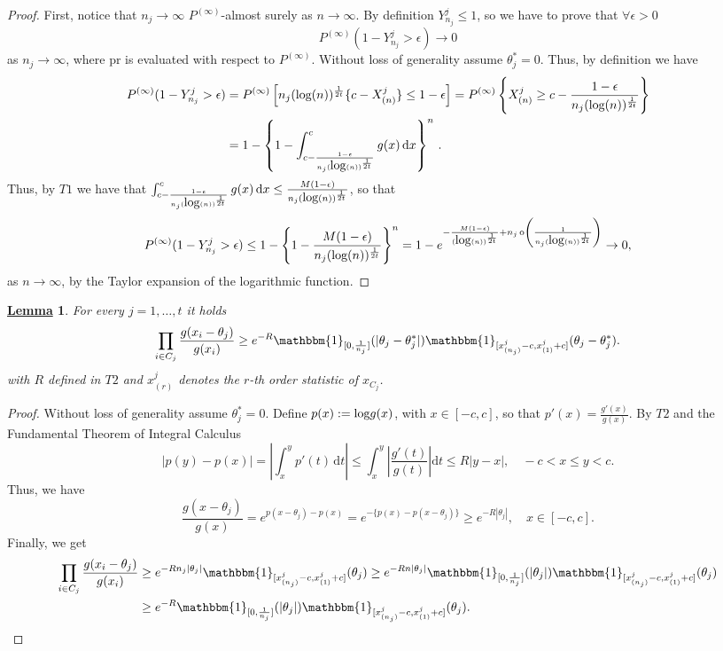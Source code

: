 \documentclass[12pt]{article}
\newtheorem{Lem}{\underline{\bf Lemma}}
\def \d {\mathrm{d}}
\def\log{\hbox{log}}
\begin{document}
\begin{proof}
First, notice that $n_j \to \infty$ $P^{(\infty)}$-almost surely as $n \to \infty$. By definition $Y^j_{n_j} \leq 1$, so we have to prove that $\forall \epsilon > 0$
\[
P^{(\infty)}\left(1- Y^j_{n_j} > \epsilon \right) \to 0
\]
as $n_j \to \infty$, where pr is evaluated with respect to $P^{(\infty)}$. Without loss of generality assume $\theta_j^* = 0$. Thus, by definition we have
\[
\begin{aligned}
P^{(\infty)}(1 - Y^j_{n_j} > \epsilon) &=P^{(\infty)}\left[n_j(\log(n))^{\frac{1}{2t}}\{c-X^j_{(n)} \} \leq 1-\epsilon \right] = P^{(\infty)}\left\{ X^j_{(n)} \geq c-\frac{1-\epsilon}{n_j(\log(n))^{\frac{1}{2t}}}\right\} \\
&= 1-\left\{1-\int_{c-\frac{1-\epsilon}{n_j(\log(n))^{\frac{1}{2t}}}}^c g(x) \, \mathrm{d}x \right\}^{n}\,.
\end{aligned}
\]
Thus, by $T1$ we have that $\int_{c-\frac{1-\epsilon}{n_j(\log(n))^{\frac{1}{2t}}}}^c g(x) \, \mathrm{d}x \leq \frac{M(1-\epsilon)}{n_j(\log(n))^{\frac{1}{2t}}}$, so that
\[
P^{(\infty)}(1 - Y^j_{n_j} > \epsilon) \leq 1-\left\{ 1- \frac{M(1-\epsilon)}{n_j(\log(n))^{\frac{1}{2t}}}\right\}^{n}= 1-e^{-\frac{M(1-\epsilon)}{(\log(n))^{\frac{1}{2t}}}+n_j \, \text{o}\left(\frac{1}{n_j(\log(n))^{\frac{1}{2t}}}\right)} \to 0,
\]
as $n \to \infty$, by the Taylor expansion of the logarithmic function.
\end{proof}
\begin{Lem}\label{denom1}
For every $j = 1, \dots, t$ it holds
\[
\prod_{i \in C_j} \frac{g(x_i - \theta_j)}{g(x_i)} \geq e^{-R} \mathbbm{1}_{[0,\frac{1}{n_j}]} (|\theta_j-\theta_j^*|) \mathbbm{1}_{[x^j_{(n_j)}-c,x^j_{(1)}+c]}(\theta_j-\theta_j^*).
\] 
with $R$ defined in $T2$ and $x^j_{(r)}$ denotes the $r$-th order statistic of $x_{C_j}$.
\end{Lem}
\begin{proof}
Without loss of generality assume $\theta_j^* = 0$. Define $p(x) := \log g(x)$, with $x \in [-c, c]$, so that $p'(x) = \frac{g'(x)}{g(x)}$. By $T2$ and the Fundamental Theorem of Integral Calculus
\[
|p(y)-p(x)| = \left\lvert \int_x^yp'(t) \, \d t \right\rvert \leq \int_x^y \left|\frac{g'(t)}{g(t)}\right| \d t \leq R|y-x|, \quad -c < x \leq y < c.
\]
Thus, we have 
\[
\frac{g(x - \theta_j)}{g(x)} = e^{p(x -\theta_j)-p(x)} = e^{-\{p(x)-p(x - \theta_j)\}} \geq e^{-R|\theta_j|}, \quad x \in [-c,c].
\]
Finally, we get
\[
\begin{aligned}
\prod_{i \in C_j} \frac{g(x_i - \theta_j)}{g(x_i)} &\geq e^{-Rn_j|\theta_j|}\mathbbm{1}_{[x^j_{(n_j)}-c,x^j_{(1)}+c]}(\theta_j) \geq e^{-Rn|\theta_j|}\mathbbm{1}_{[0,\frac{1}{n_j}]} (|\theta_j|)\mathbbm{1}_{[x^j_{(n_j)}-c,x^j_{(1)}+c]}(\theta_j)\\
& \geq e^{-R} \mathbbm{1}_{[0,\frac{1}{n_j}]} (|\theta_j|) \mathbbm{1}_{[x^j_{(n_j)}-c,x^j_{(1)}+c]}(\theta_j).
\end{aligned}
\]
\end{proof}
\end{document}
